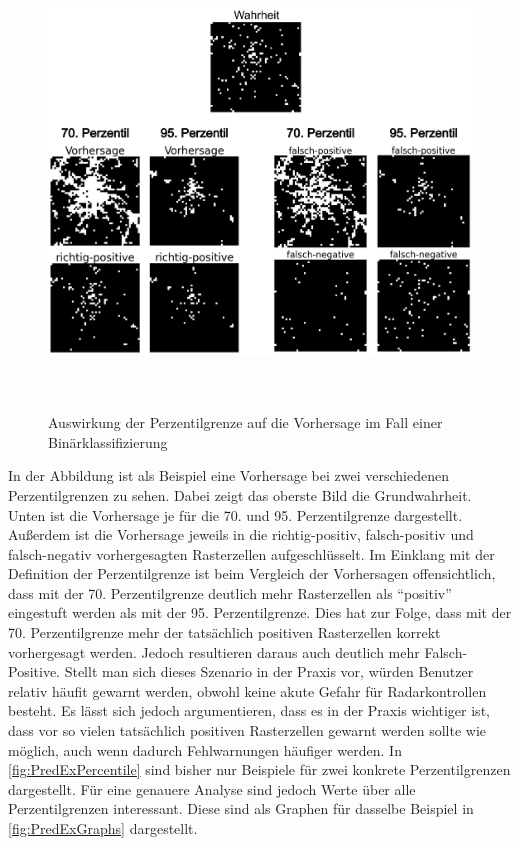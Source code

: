 \begin{figure}[h]
    \centering
    \includegraphics[width=1.0\textwidth,height=12cm,keepaspectratio=true]{content/images/PredExPercentile.png}
    \caption{Auswirkung der Perzentilgrenze auf die Vorhersage im Fall einer Binärklassifizierung}
    \label{fig:PredExPercentile}
\end{figure}

In der Abbildung ist als Beispiel eine Vorhersage bei zwei verschiedenen Perzentilgrenzen zu sehen.
Dabei zeigt das oberste Bild die Grundwahrheit.
Unten ist die Vorhersage je für die 70. und 95. Perzentilgrenze dargestellt.
Außerdem ist die Vorhersage jeweils in die richtig-positiv, falsch-positiv und falsch-negativ vorhergesagten Rasterzellen aufgeschlüsselt.
Im Einklang mit der Definition der Perzentilgrenze ist beim Vergleich der Vorhersagen offensichtlich, dass mit der 70. Perzentilgrenze deutlich mehr Rasterzellen als "`positiv"' eingestuft werden als mit der 95. Perzentilgrenze.
Dies hat zur Folge, dass mit der 70. Perzentilgrenze mehr der tatsächlich positiven Rasterzellen korrekt vorhergesagt werden.
Jedoch resultieren daraus auch deutlich mehr Falsch-Positive.
Stellt man sich dieses Szenario in der Praxis vor, würden Benutzer relativ häufit gewarnt werden, obwohl keine akute Gefahr für Radarkontrollen besteht.
Es lässt sich jedoch argumentieren, dass es in der Praxis wichtiger ist, dass vor so vielen tatsächlich positiven Rasterzellen gewarnt werden sollte wie möglich, auch wenn dadurch Fehlwarnungen häufiger werden.
In \autoref{fig:PredExPercentile} sind bisher nur Beispiele für zwei konkrete Perzentilgrenzen dargestellt.
Für eine genauere Analyse sind jedoch Werte über alle Perzentilgrenzen interessant.
Diese sind als Graphen für dasselbe Beispiel in \autoref{fig:PredExGraphs} dargestellt.

